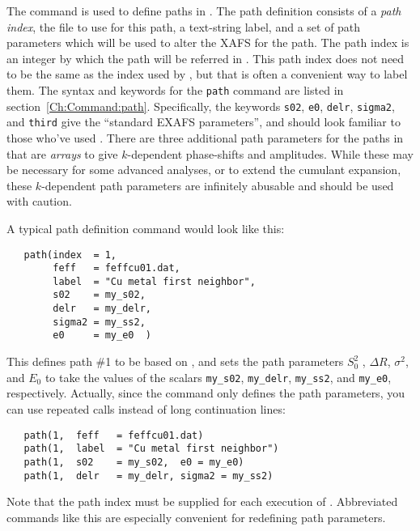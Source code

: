 The {} command is used to define paths in {\ifeffit}.  The
path definition consists of a {\emph{path index}}, the {\feffndat} file to
use for this path, a text-string label, and a set of path parameters which
will be used to alter the XAFS for the path.  The path index is an integer
by which the path will be referred in {\ifeffit}.  This path index does not
need to be the same as the index used by {\feff}, but that is often a
convenient way to label them.  The syntax and keywords for the
{\texttt{path}} command are listed in section~{\ref{Ch:Command:path}}.
Specifically, the keywords {\texttt{s02}}, {\texttt{e0}}, {\texttt{delr}},
{\texttt{sigma2}}, and {\texttt{third}} give the ``standard EXAFS
parameters'', and should look familiar to those who've used {\feffit}.
There are three additional path parameters for the paths in {\ifeffit} that
are {\emph{arrays}} to give $k$-dependent phase-shifts and amplitudes.
While these may be necessary for some advanced analyses, or to extend the
cumulant expansion, these $k$-dependent path parameters are infinitely
abusable and should be used with caution.

A typical path definition command would look like this:
\begin{verbatim}
   path(index  = 1, 
        feff   = feffcu01.dat, 
        label  = "Cu metal first neighbor", 
        s02    = my_s02, 
        delr   = my_delr,
        sigma2 = my_ss2,
        e0     = my_e0  )
\end{verbatim}
\noindent
This defines path \#1 to be based on {}, and sets the
path parameters $S_0^2$ , $\Delta R$, $\sigma^2$, and $E_0$ to take the
values of the {\ifeffit} scalars {\tt{my\_s02}}, {\tt{my\_delr}},
{\tt{my\_ss2}}, and {\tt{my\_e0}}, respectively.  Actually, since the
{} command only defines the path parameters, you can use repeated 
calls instead of long continuation lines:
\begin{verbatim}
   path(1,  feff   = feffcu01.dat) 
   path(1,  label  = "Cu metal first neighbor")
   path(1,  s02    = my_s02,  e0 = my_e0)
   path(1,  delr   = my_delr, sigma2 = my_ss2)
\end{verbatim}
\noindent
Note that the path index must be supplied for each execution of
{}.  Abbreviated {} commands like this are especially
convenient for redefining path parameters.
{}

